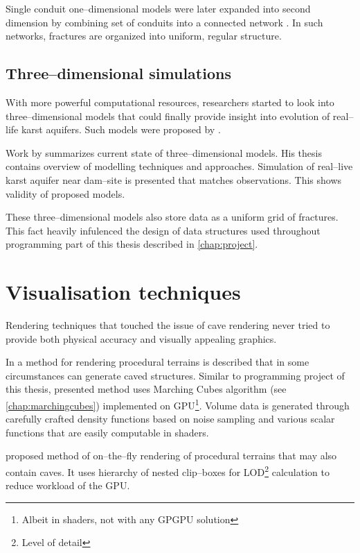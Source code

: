 Single conduit one--dimensional models were later expanded into second dimension
by combining set of conduits into a connected network \parencite[pp. 4--5]{hiller2013}.
In such networks, fractures are organized into uniform, regular structure.

\subsection{Three--dimensional simulations}

With more powerful computational resources, researchers started to look into
three--dimensional models that could finally provide insight into evolution
of real--life karst aquifers. Such models were proposed by
\cites{annable2003}{WRCR:WRCR9525}{Kaufmann2010241}.

Work by \cite{hiller2013} summarizes current state of three--dimensional models.
His thesis contains overview of modelling techniques and approaches. Simulation
of real--live karst aquifer near dam--site is presented that matches
observations. This shows validity of proposed models.

These three--dimensional models also store data as a uniform grid of fractures.
This fact heavily infulenced the design of data structures used throughout
programming part of this thesis described in \autoref{chap:project}.

\section{Visualisation techniques}

Rendering techniques that touched the issue of cave rendering never tried to
provide both physical accuracy and visually appealing graphics.

In \cite{gpugems3ch01} a method for rendering procedural terrains is described
that in some circumstances can generate caved structures. Similar to programming
project of this thesis, presented method uses Marching Cubes algorithm
(see \autoref{chap:marchingcubes}) implemented on GPU\footnote{Albeit in shaders,
not with any GPGPU solution}. Volume data is generated through carefully crafted
density functions based on noise sampling and various scalar
functions that are easily computable in shaders.

\Cite{forstmann2005} proposed method of on--the--fly rendering of procedural
terrains that may also contain caves. It uses hierarchy of nested clip--boxes
for LOD\footnote{Level of detail} calculation to reduce workload of the GPU.

